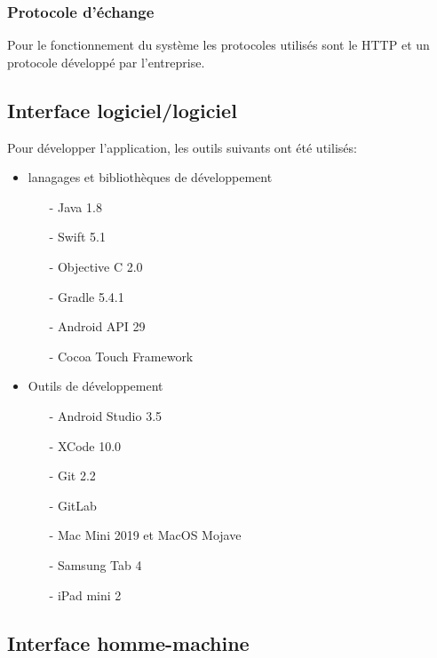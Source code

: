 \subsubsection*{Protocole d'échange}
Pour le fonctionnement du système les protocoles utilisés sont le \gls{HTTP} et un protocole développé par l'entreprise.

\subsection{Interface logiciel/logiciel}
Pour développer l'application, les outils suivants ont été utilisés:
\begin{itemize}
	\item lanagages et bibliothèques de développement 
	\begin{itemize}
		\item[-] \gls{Java} 1.8
		\item[-] \gls{Swift} 5.1
		\item[-] \gls{Objective C} 2.0
		\item[-] \gls{Gradle} 5.4.1
		\item[-] \gls{Android} API 29
		\item[-] \gls{Cocoa} Touch Framework 
	\end{itemize}
	\item Outils de développement
	\begin{itemize}
		\item[-] Android Studio 3.5
		\item[-] XCode 10.0
		\item[-] \gls{Git} 2.2
		\item[-] GitLab
		\item[-] Mac Mini 2019 et MacOS Mojave
		\item[-] Samsung Tab 4
		\item[-] iPad mini 2
	\end{itemize}
\end{itemize}

\subsection{Interface homme-machine}

